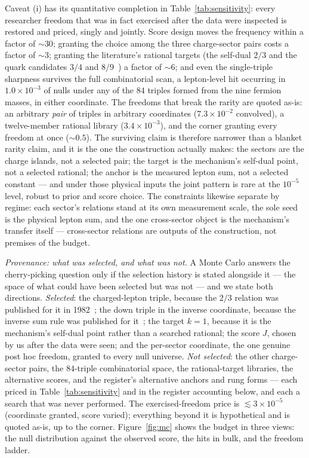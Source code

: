 \documentclass[11pt]{article}
\begin{document}
Caveat (i) has its quantitative completion in
Table~\ref{tab:sensitivity}: every researcher freedom that was in fact
exercised after the data were inspected is restored and priced, singly and
jointly. Score design moves the frequency within a factor of $\sim30$;
granting the choice among the three charge-sector pairs costs a factor of
$\sim3$; granting the literature's rational targets (the self-dual $2/3$ and
the quark candidates $3/4$ and $8/9$~\cite{Kleppe}) a factor of $\sim6$; and
even the single-triple sharpness survives the full combinatorial scan, a
lepton-level hit occurring in $1.0\times10^{-3}$ of nulls under any of the
$84$ triples formed from the nine fermion masses, in either coordinate. The
freedoms that break the rarity are quoted as-is: an arbitrary \emph{pair} of
triples in arbitrary coordinates ($7.3\times10^{-2}$ convolved), a
twelve-member rational library ($3.4\times10^{-3}$), and the corner granting
every freedom at once ($\sim0.5$). The surviving claim is therefore narrower
than a blanket rarity claim, and it is the one the construction actually
makes: the sectors are the charge islands, not a selected pair; the target is
the mechanism's self-dual point, not a selected rational; the anchor is the
measured lepton sum, not a selected constant --- and under those physical
inputs the joint pattern is rare at the $10^{-5}$ level, robust to prior and
score choice. The constraints likewise separate by regime: each sector's
relations stand at its own measurement scale, the sole seed is the physical
lepton sum, and the one cross-sector object is the mechanism's transfer
itself --- cross-sector relations are outputs of the construction, not
premises of the budget.

\emph{Provenance: what was selected, and what was not.} A Monte Carlo
answers the cherry-picking question only if the selection history is stated
alongside it --- the space of what could have been selected but was not ---
and we state both directions. \emph{Selected}: the charged-lepton triple,
because the $2/3$ relation was published for it in 1982~\cite{Koide1982};
the down triple in the inverse coordinate, because the inverse sum rule was
published for it~\cite{Rivero2026}; the target $k=1$, because it is the
mechanism's self-dual point rather than a searched rational; the score $J$,
chosen by us after the data were seen; and the per-sector coordinate, the
one genuine post hoc freedom, granted to every null universe. \emph{Not
selected}: the other charge-sector pairs, the $84$-triple combinatorial
space, the rational-target libraries, the alternative scores, and the
register's alternative anchors and rung forms --- each priced in
Table~\ref{tab:sensitivity} and in the register accounting below, and each
a search that was never performed. The exercised-freedom price is
$\lesssim 3\times10^{-5}$ (coordinate granted, score varied); everything
beyond it is hypothetical and is quoted as-is, up to the corner.
Figure~\ref{fig:mc} shows the budget in three views: the null distribution
against the observed score, the hits in bulk, and the freedom ladder.
\end{document}
